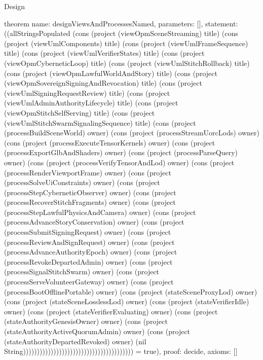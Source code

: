 \begin{lexlean}{Design}
\begin{semanticmodule}
theorem{
  name: designViewsAndProcessesNamed,
  parameters: [],
  statement: ((allStringsPopulated (cons (project (viewOpmSceneStreaming) title) (cons (project (viewUmlComponents) title) (cons (project (viewUmlFrameSequence) title) (cons (project (viewUmlVerifierStates) title) (cons (project (viewOpmCyberneticLoop) title) (cons (project (viewUmlStitchRollback) title) (cons (project (viewOpmLawfulWorldAndStory) title) (cons (project (viewOpmSovereignSigningAndRevocation) title) (cons (project (viewUmlSigningRequestReview) title) (cons (project (viewUmlAdminAuthorityLifecycle) title) (cons (project (viewOpmStitchSelfServing) title) (cons (project (viewUmlStitchSwarmSignalingSequence) title) (cons (project (processBuildSceneWorld) owner) (cons (project (processStreamUorcLods) owner) (cons (project (processExecuteTensorKernels) owner) (cons (project (processExportGlbAndShaders) owner) (cons (project (processParseQuery) owner) (cons (project (processVerifyTensorAndLod) owner) (cons (project (processRenderViewportFrame) owner) (cons (project (processSolveUiConstraints) owner) (cons (project (processStepCyberneticObserver) owner) (cons (project (processRecoverStitchFragments) owner) (cons (project (processStepLawfulPhysicsAndCamera) owner) (cons (project (processAdvanceStoryConservation) owner) (cons (project (processSubmitSigningRequest) owner) (cons (project (processReviewAndSignRequest) owner) (cons (project (processAdvanceAuthorityEpoch) owner) (cons (project (processRevokeDepartedAdmin) owner) (cons (project (processSignalStitchSwarm) owner) (cons (project (processServeVolunteerGateway) owner) (cons (project (processBootOfflinePortable) owner) (cons (project (stateSceneProxyLod) owner) (cons (project (stateSceneLosslessLod) owner) (cons (project (stateVerifierIdle) owner) (cons (project (stateVerifierEvaluating) owner) (cons (project (stateAuthorityGenesisOwner) owner) (cons (project (stateAuthorityActiveQuorumAdmin) owner) (cons (project (stateAuthorityDepartedRevoked) owner) (nil String)))))))))))))))))))))))))))))))))))))))) = true),
  proof: decide{},
  axioms: []
}


\end{semanticmodule}
\end{lexlean}
